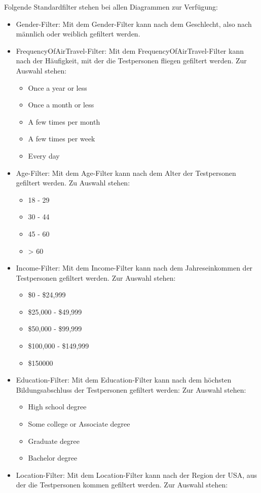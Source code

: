 \documentclass{mi-seminar}
\begin{document}
Folgende Standardfilter stehen bei allen Diagrammen zur Verfügung:
\begin{itemize}
\item Gender-Filter: Mit dem Gender-Filter kann nach dem Geschlecht, also nach männlich oder weiblich gefiltert werden.
\item FrequencyOfAirTravel-Filter: Mit dem FrequencyOfAirTravel-Filter kann nach der Häufigkeit, mit der die Testpersonen fliegen gefiltert werden. Zur Auswahl stehen: 
	\begin{itemize}
	\item Once a year or less
	\item Once a month or less
	\item A few times per month
	\item A few times per week
	\item Every day
	\end{itemize}
\item Age-Filter: Mit dem Age-Filter kann nach dem Alter der Testpersonen gefiltert werden. Zu Auswahl stehen: 
	\begin{itemize}
	\item 18 - 29
	\item 30 - 44
	\item 45 - 60
	\item > 60
	\end{itemize}
\item Income-Filter: Mit dem Income-Filter kann nach dem Jahreseinkommen der Testpersonen gefiltert werden. Zur Auswahl stehen: 
	\begin{itemize}
	\item \$0 - \$24,999
	\item \$25,000 - \$49,999
	\item \$50,000 - \$99,999
	\item \$100,000 - \$149,999
	\item \$150000
	\end{itemize}
\item Education-Filter: Mit dem Education-Filter kann nach dem höchsten Bildungsabschluss der Testpersonen gefiltert werden: Zur Auswahl stehen:
	\begin{itemize}
	\item High school degree
	\item Some college or Associate degree
	\item Graduate degree
	\item Bachelor degree
	\end{itemize}
\item Location-Filter: Mit dem Location-Filter kann nach der Region der USA, aus der die Testpersonen kommen gefiltert werden. Zur Auswahl stehen:

\end{itemize}
\end{document}
